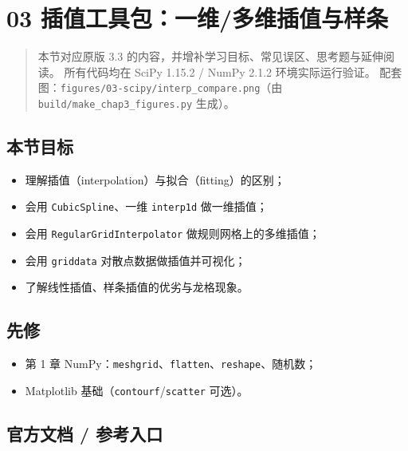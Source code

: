 \section{03
插值工具包：一维/多维插值与样条}\label{ux63d2ux503cux5de5ux5177ux5305ux4e00ux7ef4ux591aux7ef4ux63d2ux503cux4e0eux6837ux6761}

\begin{quote}
本节对应原版 3.3 的内容，并增补学习目标、常见误区、思考题与延伸阅读。
所有代码均在 SciPy 1.15.2 / NumPy 2.1.2 环境实际运行验证。
配套图：\texttt{figures/03-scipy/interp\_compare.png}（由
\texttt{build/make\_chap3\_figures.py} 生成）。
\end{quote}

\subsection{本节目标}\label{ux672cux8282ux76eeux6807-15}

\begin{itemize}
\tightlist
\item
  理解插值（interpolation）与拟合（fitting）的区别；
\item
  会用 \texttt{CubicSpline}、一维 \texttt{interp1d} 做一维插值；
\item
  会用 \texttt{RegularGridInterpolator} 做规则网格上的多维插值；
\item
  会用 \texttt{griddata} 对散点数据做插值并可视化；
\item
  了解线性插值、样条插值的优劣与龙格现象。
\end{itemize}

\subsection{先修}\label{ux5148ux4fee-8}

\begin{itemize}
\tightlist
\item
  第 1 章
  NumPy：\texttt{meshgrid}、\texttt{flatten}、\texttt{reshape}、随机数；
\item
  Matplotlib 基础（\texttt{contourf}/\texttt{scatter} 可选）。
\end{itemize}

\subsection{官方文档 /
参考入口}\label{ux5b98ux65b9ux6587ux6863-ux53c2ux8003ux5165ux53e3-2}


